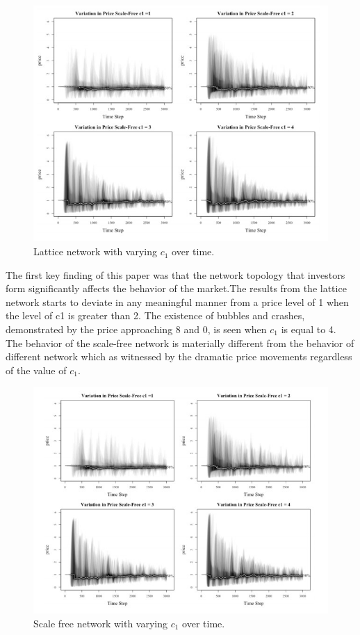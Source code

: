 \documentclass[runningheads]{llncs}
\begin{document}
\begin{figure}[H]
\centering
\includegraphics[width=\textwidth]{Fig5.jpg}
\caption{Lattice network with varying $c_1$ over time.} \label{fig1}
\end{figure}
The first key finding of this paper was that the network topology that investors form significantly affects the behavior of the market.The results from the lattice network starts to deviate in any meaningful manner from a price level of 1 when the level of c1 is greater than 2. The existence of bubbles and crashes, demonstrated by the price approaching 8 and 0, is seen when $c_1$ is equal to 4. The behavior of the scale-free network is materially different from the behavior of different network which as witnessed by the dramatic price movements regardless of the value of $c_1$.
\begin{figure}[H]
\includegraphics[width=\textwidth]{Fig6.jpg}
\caption{Scale free network with varying $c_1$ over time.} \label{fig2}
\end{figure}
\end{document}
